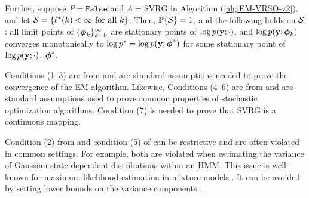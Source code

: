 \begin{theorem}
    Further, suppose $P = \texttt{False}$ and $A = \text{SVRG}$ in Algorithm (\ref{alg:EM-VRSO-v2}), and let $\mathcal{S} = \{\ell^*(k) < \infty \text{ for all } k \}$. Then, $\mathbb{P}\{\mathcal{S}\} = 1$, and the following holds on $\mathcal{S}$: all limit points of $\{\boldsymbol{\phi}_{k}\}_{k=0}^\infty$  are stationary points of $\log p(\mathbf{y};\cdot)$, and $\log p(\mathbf{y};\boldsymbol{\phi}_{k})$ converges monotonically to $\log p^* = \log p(\mathbf{y};\boldsymbol{\phi}^*)$ for some stationary point of $\log p(\mathbf{y};\cdot)$, $\boldsymbol{\phi}^*$.
\end{theorem}
%




Conditions (1--3) are from \citet{Wu:1983} and are standard assumptions needed to prove the convergence of the EM algorithm. Likewise, Conditions (4--6) are from \citet{Johnson:2013} and are standard assumptions used to prove common properties of stochastic optimization algorithms. Condition (7) is needed to prove that SVRG is a continuous mapping.

Condition (2) from \citet{Wu:1983} and condition (5) of \citet{Johnson:2013} can be restrictive and are often violated in common settings. For example, both are violated when estimating the variance of Gaussian state-dependent distributions within an HMM. This issue is well-known for maximum likelihood estimation in mixture models \citep{Chen:2009,Liu:2015b}. It can be avoided by setting lower bounds on the variance components \citep{Zucchini:2016}. %

